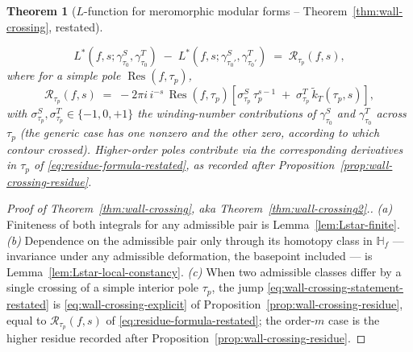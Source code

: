 \documentclass[11pt]{article}
\newtheorem{theorem}{Theorem}[section]
\numberwithin{equation}{section}  %
\newcommand{\HH}{\mathbb{H}}
\DeclareMathOperator{\Res}{Res}
\begin{document}
\begin{theorem}[$L$-function for meromorphic modular forms -- Theorem~\ref{thm:wall-crossing}, restated]
\begin{enumerate}[label=(\alph*),leftmargin=2em]
\begin{equation}\label{eq:wall-crossing-statement-restated}
  L^*(f, s; \gamma^S_{\tau_0}, \gamma^T_{\tau_0})
  \;-\;
  L^*(f, s; \gamma^S_{\tau_0'}, \gamma^T_{\tau_0'})
  \;=\; \mathcal{R}_{\tau_p}(f, s),
\end{equation}
where for a simple pole $\Res(f, \tau_p)$,
\begin{equation}\label{eq:residue-formula-restated}
  \mathcal{R}_{\tau_p}(f, s)
  \;=\; -2\pi i\,i^{-s}\,\Res(f, \tau_p)\!
  \left[\sigma^S_{\tau_p}\,\tau_p^{s - 1}
  \;+\; \sigma^T_{\tau_p}\,\widetilde{k}_T(\tau_p, s)\right],
\end{equation}
with $\sigma^S_{\tau_p}, \sigma^T_{\tau_p} \in \{-1, 0, +1\}$ the
winding-number contributions of $\gamma^S_{\tau_0}$ and $\gamma^T_{\tau_0}$ across
$\tau_p$ (the generic case has one nonzero and the other zero,
according to which contour crossed).  Higher-order poles contribute
via the corresponding derivatives in $\tau_p$ of
\eqref{eq:residue-formula-restated}, as recorded after
Proposition~\ref{prop:wall-crossing-residue}.
\end{enumerate}
\end{theorem}%

\begin{proof}[Proof of Theorem~\ref{thm:wall-crossing}, aka Theorem~\ref{thm:wall-crossing2}.]
\emph{(a)} Finiteness of both integrals for any admissible pair is
Lemma~\ref{lem:Lstar-finite}.
\emph{(b)} Dependence on the admissible pair only through its homotopy
class in $\HH_f$ --- invariance under any admissible deformation, the
basepoint included --- is Lemma~\ref{lem:Lstar-local-constancy}.
\emph{(c)} When two admissible classes differ by a single crossing of
a simple interior pole $\tau_p$, the jump
\eqref{eq:wall-crossing-statement-restated} is
\eqref{eq:wall-crossing-explicit} of
Proposition~\ref{prop:wall-crossing-residue}, equal to
$\mathcal{R}_{\tau_p}(f, s)$ of \eqref{eq:residue-formula-restated};
the order-$m$ case is the higher residue recorded after
Proposition~\ref{prop:wall-crossing-residue}.
\end{proof}
\end{document}
